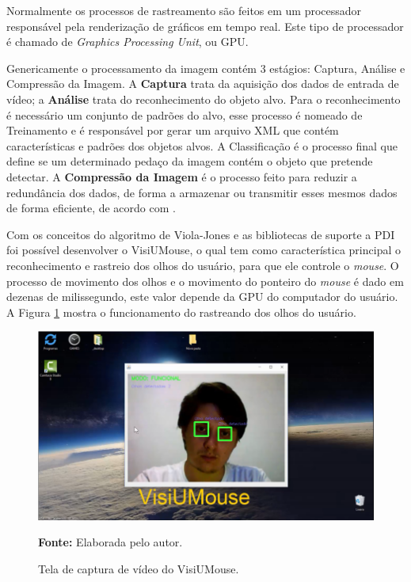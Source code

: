 Normalmente os processos de rastreamento são feitos em um processador responsável pela renderização de gráficos em tempo real. Este tipo de processador é chamado de \textit{Graphics Processing Unit}, ou GPU.

Genericamente o processamento da imagem contém 3 estágios: Captura, Análise e Compressão da Imagem. A \textbf{Captura} trata da aquisição dos dados de entrada de vídeo; a \textbf{Análise} trata do reconhecimento do objeto alvo. Para o reconhecimento é necessário um conjunto de padrões do alvo, esse processo é nomeado de Treinamento e é responsável por gerar um arquivo XML que contém características e padrões dos objetos alvos. A Classificação é o processo final que define se um determinado pedaço da imagem contém o objeto que pretende detectar. A \textbf{Compressão da Imagem} é o processo feito para reduzir a redundância dos dados, de forma a armazenar ou transmitir esses mesmos dados de forma eficiente, de acordo com .

Com os conceitos do algoritmo de Viola-Jones e as bibliotecas de suporte a PDI foi possível desenvolver o VisiUMouse, o qual tem como característica principal o reconhecimento e rastreio dos olhos do usuário, para  que ele controle o \textit{mouse}. O processo de movimento dos olhos e o movimento do ponteiro do \textit{mouse} é dado em dezenas de milissegundo, este valor depende da GPU do computador do usuário. A Figura \ref{fig:visiumouse-1} mostra o funcionamento do rastreando dos olhos do usuário.
\begin{figure}[H]
\centering
\caption{Tela de captura de vídeo do VisiUMouse.}
\includegraphics[scale=.4]{img/visiumouse-1.png}

 {\fontsize{11}{11}\selectfont \textbf{Fonte:} Elaborada pelo autor.}
\label{fig:visiumouse-1}
\end{figure}

